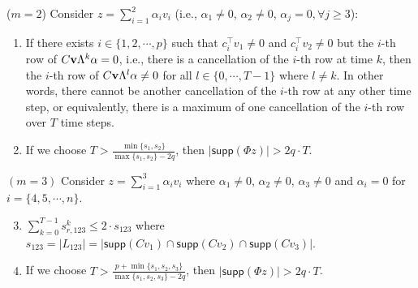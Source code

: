 \documentclass[../thesis.tex]{subfiles}
\begin{document}


\begin{lem}\label{lem:two_vec}
($m=2$)  Consider $z = \sum_{i=1}^2 \alpha_i v_i $ (i.e.,  $\alpha_1 \neq 0$, $\alpha_2 \neq 0$, $\alpha_j = 0, \forall j\ge 3$):
\begin{enumerate}
\item 
If there exists $i \in \{1, 2, \cdots, p\}$ such that $c_i^\top v_1 \neq 0$ and $c_i^\top v_2 \neq 0$ but the $i$-th row of $C {\bf v} \Lambda^k \alpha = 0$, i.e., there is a cancellation of the $i$-th row at time $k$, then the $i$-th row of $C{\bf v} \Lambda^l \alpha \neq 0$ for all $l \in \{ 0, \cdots, T-1 \}$ where $l \neq k$. In other words, there cannot be another cancellation of the $i$-th row at any other time step, or equivalently, there is a maximum of one cancellation of the $i$-th row over $T$ time steps.
\item 
If we choose $T  >  \frac { \min \{s_1, s_2\}} { \max\{s_1, s_2\} - 2q }$, then $\lvert \textsf{supp} (\Phi z) \rvert > 2q\cdot T$. 
\end{enumerate}


$(m=3)$ Consider $z = \sum_{i=1}^3 \alpha_i v_i $ where $\alpha_1 \neq 0$, $\alpha_2 \neq 0$, $\alpha_3 \neq 0$ and $\alpha_i = 0$ for $i = \{4, 5, \cdots , n\}$.   
\begin{enumerate}\setcounter{enumi}{2}
\item 
$\sum_{k=0}^{T-1} s_{r,123}^k \le 2 \cdot s_{123}$ where $s_{123} = \lvert L_{123} \rvert = \lvert \textsf{supp} (Cv_1) \cap \textsf{supp} (Cv_2) \cap \textsf{supp} (Cv_3)  \rvert$.
\item  
If we choose $T > \frac { p + \min \{ s_1, s_2, s_3 \}} { \max \{s_1, s_2, s_3 \} - 2q }$,  then $\lvert \textsf{supp} (\Phi z)\rvert > 2q \cdot T$.
\end{enumerate}
\end{lem}

\end{document}
